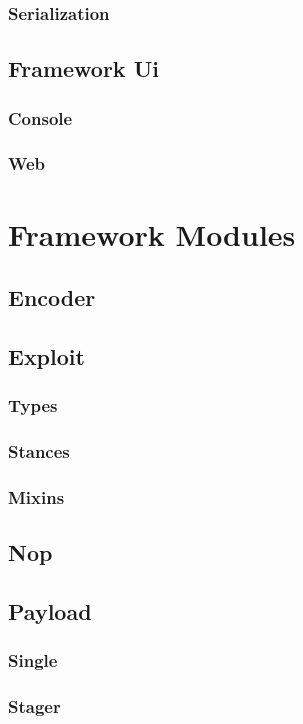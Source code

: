 \documentclass{report}
\begin{document}
        \subsection{Serialization}
    \section{Framework Ui}
        \subsection{Console}
        \subsection{Web}
\chapter{Framework Modules}
    \section{Encoder}
    \section{Exploit}
        \subsection{Types}
        \subsection{Stances}
        \subsection{Mixins}
    \section{Nop}
    \section{Payload}
        \subsection{Single}
        \subsection{Stager}
\end{document}
